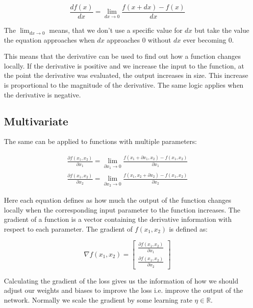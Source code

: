 \begin{equation}
	\frac{df(x)}{dx} = \lim_{dx \to 0}\frac{f(x + dx) - f(x)}{dx}
\end{equation}

The $\lim_{dx \to 0}$ means, that we don't use a specific value for $dx$ but take the value the equation approaches when $dx$ approaches $0$ without $dx$ ever becoming $0$.

This means that the derivative can be used to find out how a function changes locally. If the derivative is positive and we increase the input to the function, at the point the derivative was evaluated, the output increases in size. This increase is proportional to the magnitude of the derivative. The same logic applies when the derivative is negative.


\subsection{Multivariate}
The same can be applied to functions with multiple parameters:

\begin{equation}
\begin{split}
	\frac{\partial f(x_1, x_2)}{\partial x_1} = \lim_{\partial x_1 \to 0}\frac{f(x_1 + \partial x_1, x_2) - f(x_1, x_2)}{\partial x_1} \\
	\frac{\partial f(x_1, x_2)}{\partial x_2} = \lim_{\partial x_2 \to 0}\frac{f(x_1, x_2 + \partial x_2) - f(x_1, x_2)}{\partial x_2}
\end{split}
\end{equation}

Here each equation defines as how much the output of the function changes locally when the corresponding input parameter to the function increases.
The gradient of a function is a vector containing the derivative information with respect to each parameter. The gradient of $f(x_1, x_2)$ is defined as:

\begin{equation}
\nabla f(x_1, x_2) =
	\begin{bmatrix}
	\frac{\partial f(x_1, x_2)}{\partial x_1} \\[2mm]
	\frac{\partial f(x_1, x_2)}{\partial x_2}
	\end{bmatrix}
\end{equation}

Calculating the gradient of the loss gives us the information of how we should adjust our weights and biases to improve the loss i.e. improve the output of the network. Normally we scale the gradient by some learning rate $\eta \in \mathbb{R}$.


